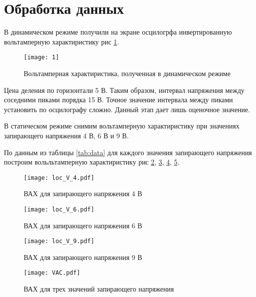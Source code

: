     \section*{Обработка данных}

    В динамическом режиме получили на экране осцилогрфа инвертированную вольтамперную характиристику рис \ref{fig:1}.

    \begin{figure}[h]
        \centering
        \texttt{[image: 1]}
        \caption{Вольтамперная характиристика, полученная в динамическом режиме}
        \label{fig:1}
    \end{figure}

    \noindent Цена деления по горизонтали 5 В. Таким образом, интервал напряжения между соседними пиками порядка 15 В.
    Точное значение интервала между пиками установить по осцилографу сложно. Данный этап дает лишь оценочное значение.

    \noindent В статическом режиме снимим вольтамперную характиристику при значениях запирающего напряжения 4 В, 6 В и 9 В.

    

    \noindent По данным из таблицы \ref{tab:data} для каждого значения запирающего напряжения построим вольльтамперную 
    характиристику рис \ref{fig:loc_V_4}, \ref{fig:loc_V_6}, \ref{fig:loc_V_9}, \ref{fig:VAC}.

    \begin{figure}[h]
        \centering
        \texttt{[image: loc\_V\_4.pdf]}
        \caption{ВАХ для запирающего напряжения 4 В}
        \label{fig:loc_V_4}
    \end{figure}

    \begin{figure}[h]
        \centering
        \texttt{[image: loc\_V\_6.pdf]}
        \caption{ВАХ для запирающего напряжения 6 В}
        \label{fig:loc_V_6}
    \end{figure}

    \begin{figure}[h]
        \centering
        \texttt{[image: loc\_V\_9.pdf]}
        \caption{ВАХ для запирающего напряжения 9 В}
        \label{fig:loc_V_9}
    \end{figure}

    \begin{figure}[h]
        \centering
        \texttt{[image: VAC.pdf]}
        \caption{ВАХ для трех значений запирающего напряжения}
        \label{fig:VAC}
    \end{figure}

